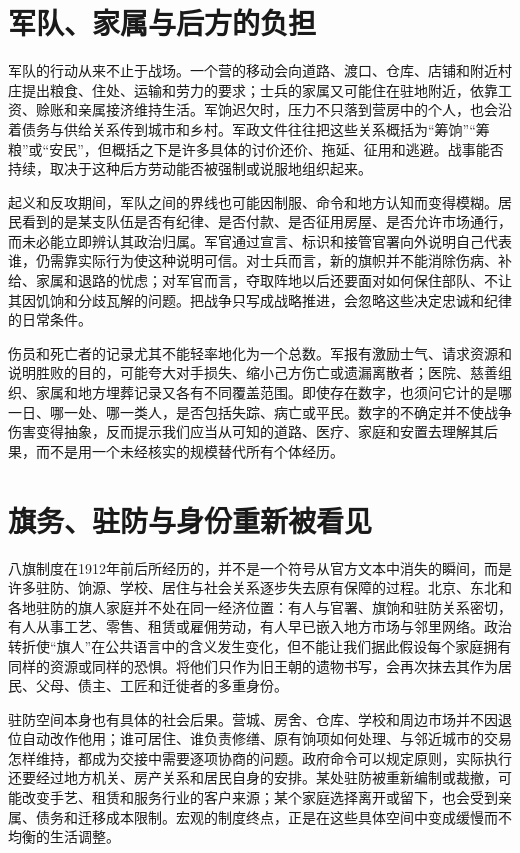 \section{军队、家属与后方的负担}

军队的行动从来不止于战场。一个营的移动会向道路、渡口、仓库、店铺和附近村庄提出粮食、住处、运输和劳力的要求；士兵的家属又可能住在驻地附近，依靠工资、赊账和亲属接济维持生活。军饷迟欠时，压力不只落到营房中的个人，也会沿着债务与供给关系传到城市和乡村。军政文件往往把这些关系概括为“筹饷”“筹粮”或“安民”，但概括之下是许多具体的讨价还价、拖延、征用和逃避。战事能否持续，取决于这种后方劳动能否被强制或说服地组织起来。

起义和反攻期间，军队之间的界线也可能因制服、命令和地方认知而变得模糊。居民看到的是某支队伍是否有纪律、是否付款、是否征用房屋、是否允许市场通行，而未必能立即辨认其政治归属。军官通过宣言、标识和接管官署向外说明自己代表谁，仍需靠实际行为使这种说明可信。对士兵而言，新的旗帜并不能消除伤病、补给、家属和退路的忧虑；对军官而言，夺取阵地以后还要面对如何保住部队、不让其因饥饷和分歧瓦解的问题。把战争只写成战略推进，会忽略这些决定忠诚和纪律的日常条件。

伤员和死亡者的记录尤其不能轻率地化为一个总数。军报有激励士气、请求资源和说明胜败的目的，可能夸大对手损失、缩小己方伤亡或遗漏离散者；医院、慈善组织、家属和地方埋葬记录又各有不同覆盖范围。即使存在数字，也须问它计的是哪一日、哪一处、哪一类人，是否包括失踪、病亡或平民。数字的不确定并不使战争伤害变得抽象，反而提示我们应当从可知的道路、医疗、家庭和安置去理解其后果，而不是用一个未经核实的规模替代所有个体经历。

\section{旗务、驻防与身份重新被看见}

八旗制度在1912年前后所经历的，并不是一个符号从官方文本中消失的瞬间，而是许多驻防、饷源、学校、居住与社会关系逐步失去原有保障的过程。北京、东北和各地驻防的旗人家庭并不处在同一经济位置：有人与官署、旗饷和驻防关系密切，有人从事工艺、零售、租赁或雇佣劳动，有人早已嵌入地方市场与邻里网络。政治转折使“旗人”在公共语言中的含义发生变化，但不能让我们据此假设每个家庭拥有同样的资源或同样的恐惧。将他们只作为旧王朝的遗物书写，会再次抹去其作为居民、父母、债主、工匠和迁徙者的多重身份。

驻防空间本身也有具体的社会后果。营城、房舍、仓库、学校和周边市场并不因退位自动改作他用；谁可居住、谁负责修缮、原有饷项如何处理、与邻近城市的交易怎样维持，都成为交接中需要逐项协商的问题。政府命令可以规定原则，实际执行还要经过地方机关、房产关系和居民自身的安排。某处驻防被重新编制或裁撤，可能改变手艺、租赁和服务行业的客户来源；某个家庭选择离开或留下，也会受到亲属、债务和迁移成本限制。宏观的制度终点，正是在这些具体空间中变成缓慢而不均衡的生活调整。

